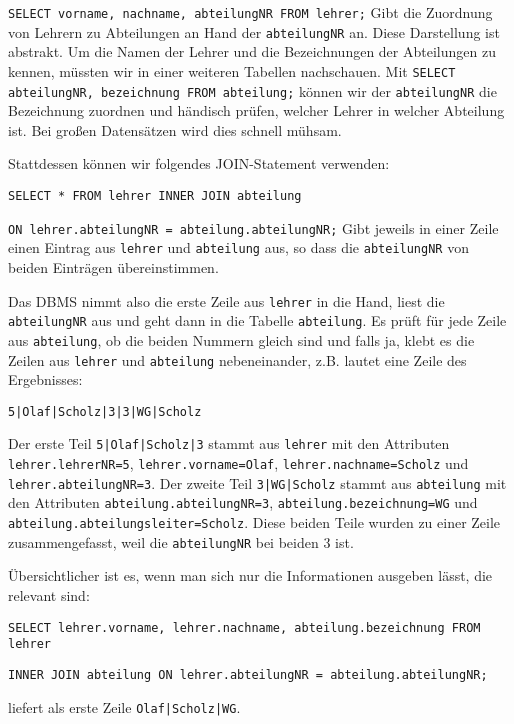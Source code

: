\lstinline!SELECT vorname, nachname, abteilungNR FROM lehrer;!
Gibt die Zuordnung von Lehrern zu Abteilungen an Hand der \lstinline!abteilungNR! an. Diese Darstellung ist abstrakt. Um die Namen der Lehrer und die Bezeichnungen der Abteilungen zu kennen, müssten wir in einer weiteren Tabellen nachschauen. Mit \lstinline!SELECT abteilungNR, bezeichnung FROM abteilung;! können wir der \lstinline!abteilungNR! die Bezeichnung zuordnen und händisch prüfen, welcher Lehrer in welcher Abteilung ist. Bei großen Datensätzen wird dies schnell mühsam.

Stattdessen können wir folgendes JOIN-Statement verwenden:

\lstinline!SELECT * FROM lehrer INNER JOIN abteilung!

\lstinline!ON lehrer.abteilungNR = abteilung.abteilungNR;!
Gibt jeweils in einer Zeile einen Eintrag aus \lstinline!lehrer! und \lstinline!abteilung! aus, so dass die \lstinline!abteilungNR! von beiden Einträgen übereinstimmen.

Das DBMS nimmt also die erste Zeile aus \lstinline!lehrer! in die Hand, liest die \lstinline!abteilungNR! aus und geht dann in die Tabelle \lstinline!abteilung!. Es prüft für jede Zeile aus \lstinline!abteilung!, ob die beiden Nummern gleich sind und falls ja, klebt es die Zeilen aus \lstinline!lehrer! und \lstinline!abteilung! nebeneinander, z.B. lautet eine Zeile des Ergebnisses:

\lstinline!5|Olaf|Scholz|3|3|WG|Scholz!

Der erste Teil \lstinline!5|Olaf|Scholz|3! stammt aus \lstinline!lehrer! mit den Attributen \lstinline!lehrer.lehrerNR=5!, \lstinline!lehrer.vorname=Olaf!, \lstinline!lehrer.nachname=Scholz! und \lstinline!lehrer.abteilungNR=3!. Der zweite Teil \lstinline!3|WG|Scholz! stammt aus \lstinline!abteilung! mit den Attributen \lstinline!abteilung.abteilungNR=3!, \lstinline!abteilung.bezeichnung=WG! und \lstinline!abteilung.abteilungsleiter=Scholz!. Diese beiden Teile wurden zu einer Zeile zusammengefasst, weil die \lstinline!abteilungNR! bei beiden 3 ist.

Übersichtlicher ist es, wenn man sich nur die Informationen ausgeben lässt, die relevant sind:

\lstinline!SELECT lehrer.vorname, lehrer.nachname, abteilung.bezeichnung FROM lehrer!

\lstinline!INNER JOIN abteilung ON lehrer.abteilungNR = abteilung.abteilungNR;!

liefert als erste Zeile \lstinline!Olaf|Scholz|WG!.

